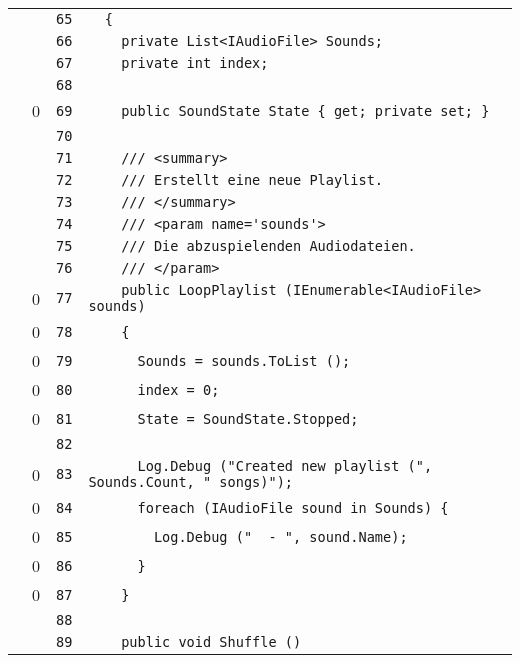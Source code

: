 \documentclass[a4paper,10pt]{article}
\begin{document}
\begin{longtable}[l]{lrrl}
\cellcolor{gray} &  & \verb~65~ & \verb~  {~\\
\cellcolor{gray} &  & \verb~66~ & \verb~    private List<IAudioFile> Sounds;~\\
\cellcolor{gray} &  & \verb~67~ & \verb~    private int index;~\\
\cellcolor{gray} &  & \verb~68~ & \verb~~\\
\cellcolor{red} & 0 & \verb~69~ & \verb~    public SoundState State { get; private set; }~\\
\cellcolor{gray} &  & \verb~70~ & \verb~~\\
\cellcolor{gray} &  & \verb~71~ & \verb~    /// <summary>~\\
\cellcolor{gray} &  & \verb~72~ & \verb~    /// Erstellt eine neue Playlist.~\\
\cellcolor{gray} &  & \verb~73~ & \verb~    /// </summary>~\\
\cellcolor{gray} &  & \verb~74~ & \verb~    /// <param name='sounds'>~\\
\cellcolor{gray} &  & \verb~75~ & \verb~    /// Die abzuspielenden Audiodateien.~\\
\cellcolor{gray} &  & \verb~76~ & \verb~    /// </param>~\\
\cellcolor{red} & 0 & \verb~77~ & \verb~    public LoopPlaylist (IEnumerable<IAudioFile> sounds)~\\
\cellcolor{red} & 0 & \verb~78~ & \verb~    {~\\
\cellcolor{red} & 0 & \verb~79~ & \verb~      Sounds = sounds.ToList ();~\\
\cellcolor{red} & 0 & \verb~80~ & \verb~      index = 0;~\\
\cellcolor{red} & 0 & \verb~81~ & \verb~      State = SoundState.Stopped;~\\
\cellcolor{gray} &  & \verb~82~ & \verb~~\\
\cellcolor{red} & 0 & \verb~83~ & \verb~      Log.Debug ("Created new playlist (", Sounds.Count, " songs)");~\\
\cellcolor{red} & 0 & \verb~84~ & \verb~      foreach (IAudioFile sound in Sounds) {~\\
\cellcolor{red} & 0 & \verb~85~ & \verb~        Log.Debug ("  - ", sound.Name);~\\
\cellcolor{red} & 0 & \verb~86~ & \verb~      }~\\
\cellcolor{red} & 0 & \verb~87~ & \verb~    }~\\
\cellcolor{gray} &  & \verb~88~ & \verb~~\\
\cellcolor{gray} &  & \verb~89~ & \verb~    public void Shuffle ()~\\

\end{longtable}
\end{document}
